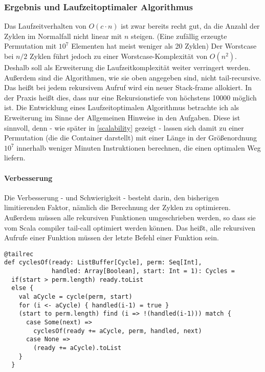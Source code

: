 \subsubsection{Ergebnis und Laufzeitoptimaler Algorithmus} %
Das Laufzeitverhalten von $O(c \cdot n)$ ist zwar bereits recht gut, da die Anzahl der Zyklen im Normalfall nicht linear mit $n$ steigen.
(Eine zufällig erzeugte Permutation mit $10^7$ Elementen hat meist weniger als 20 Zyklen)%
Der Worstcase bei $n/2$ Zyklen führt jedoch zu einer Worstcase-Komplexität von $O(n^2)$. \\
Deshalb soll als Erweiterung die Laufzeitkomplexität weiter verringert werden. \\
Außerdem sind die Algorithmen, wie sie oben angegeben sind, nicht tail-recursive.
Das heißt bei jedem rekursivem Aufruf wird ein neuer Stack-frame allokiert.
In der Praxis heißt dies, dass nur eine Rekursionstiefe von höchstens 10000 möglich ist.
Die Entwicklung eines Laufzeitoptimalen Algorithmus betrachte ich als Erweiterung im Sinne der Allgemeinen Hinweise in den Aufgaben.
Diese ist sinnvoll, denn - wie später in \ref{scalability} gezeigt -
lassen sich damit zu einer Permutation (die die Container darstellt)
mit einer Länge in der Größenordnung $10^7$ innerhalb weniger Minuten Instruktionen berechnen, die einen optimalen Weg liefern.

\paragraph{Verbesserung}
\label{fast_cycler}
Die Verbesserung - und Schwierigkeit - besteht darin, den bisherigen limitierenden Faktor, nämlich die Berechnung der Zyklen zu optimieren.
Außerdem müssen alle rekursiven Funktionen umgeschrieben werden, so dass sie vom Scala compiler tail-call optimiert werden können.
Das heißt, alle rekursiven Aufrufe einer Funktion müssen der letzte Befehl einer Funktion sein.
\begin{lstlisting}
@tailrec
def cyclesOf(ready: ListBuffer[Cycle], perm: Seq[Int],
             handled: Array[Boolean], start: Int = 1): Cycles =
  if(start > perm.length) ready.toList
  else {
    val aCycle = cycle(perm, start)
    for (i <- aCycle) { handled(i-1) = true }
    (start to perm.length) find (i => !(handled(i-1))) match {
      case Some(next) =>
        cyclesOf(ready += aCycle, perm, handled, next)
      case None =>
        (ready += aCycle).toList
    }
  }
\end{lstlisting}


